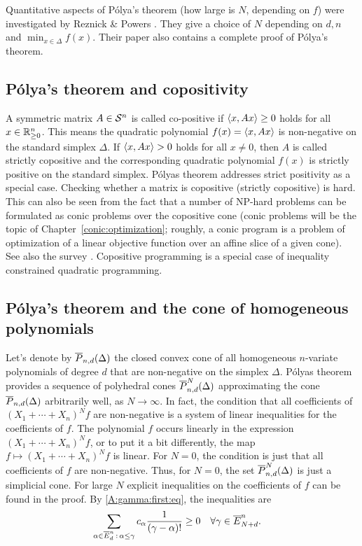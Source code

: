\begin{remark}
	Quantitative aspects of P\'olya's theorem (how large is $N$, depending on $f$) were investigated by Reznick \& Powers \cite{Powers:Reznick:2001}. They give a choice of $N$ depending on $d,n$ and $\min_{x \in \Delta} f(x)$. Their paper also contains a complete proof of P\'olya's theorem. 
\end{remark}

\subsection{P\'olya's theorem and copositivity} 

A symmetric matrix $A \in \mathcal{S}^n$ is called co-positive if $\left\langle x , A x \right\rangle \ge 0$ holds for all $x \in \mathbb{R}_{\ge 0}^n$. This means the quadratic polynomial $f(x) = \left\langle x , A x \right\rangle$ is non-negative on the standard simplex $\Delta$. If $\left\langle x , Ax \right\rangle>0$ holds for all $x \ne 0$, then $A$ is called strictly copositive and the corresponding quadratic polynomial $f(x)$ is strictly positive on the standard simplex. P\'olyas theorem addresses strict positivity as a special case. Checking whether a matrix is copositive (strictly copositive) is hard. This can also be seen from the fact that a number of NP-hard problems can be formulated as conic problems over the copositive cone (conic problems will be the topic of Chapter~\ref{conic:optimization}; roughly, a conic program is a problem of optimization of a linear objective function over an affine slice of a given cone). See also the survey \cite{dur2010copositive}. Copositive programming is a special case of inequality constrained quadratic programming. 


\subsection{P\'olya's theorem and the cone of homogeneous polynomials} 

Let's denote by $\overline{P}_{n,d}(\Delta)$ the closed convex cone of all homogeneous $n$-variate polynomials of degree $d$ that are non-negative on the simplex $\Delta$. P\'olyas theorem provides a sequence of polyhedral cones $\overline{P}_{n,d}^N(\Delta)$ approximating the cone $\overline{P}_{n,d}(\Delta)$ arbitrarily well, as $N \to \infty$. In fact, the condition that all coefficients of $(X_1+\cdots +X_n)^N f$ are non-negative is a system of linear inequalities for the coefficients of $f$. The polynomial $f$ occurs linearly in the expression $(X_1+\cdots + X_n)^N f$, or to put it a bit differently, the map $f \mapsto (X_1+ \cdots +X_n)^N f$ is linear. For $N=0$, the condition is just that all coefficients of $f$ are non-negative. Thus, for $N=0$, the set $\overline{P}_{n,d}^N(\Delta)$ is just a simplicial cone. For large $N$ explicit inequalities on the coefficients of $f$ can be found in the proof. By \eqref{A:gamma:first:eq}, the inequalities are 
	\begin{align*}
		\sum_{\alpha \in \overline{E}^n_d \,:\, \alpha \le \gamma} c_\alpha \frac{1}{(\gamma-\alpha)!} & \ge 0 & & \forall \gamma \in \overline{E}^n_{N+d}.
	\end{align*}


